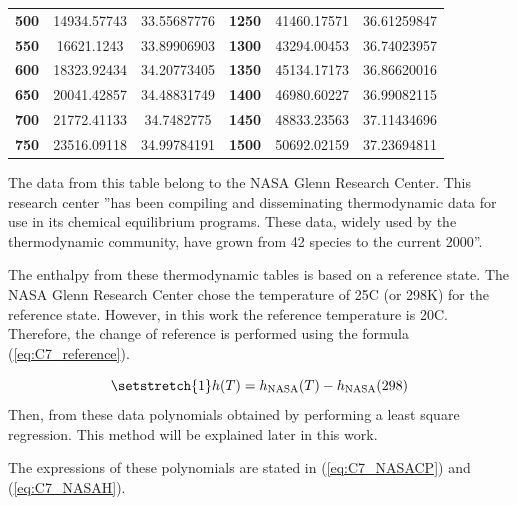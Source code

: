 \begin{longtable}[c]{@{}ccc|ccc@{}}
\textbf{500}                                      & 14934.57743         & 33.55687776            & \textbf{1250}                                   & 41460.17571         & 36.61259847            \\
\textbf{550}                                      & 16621.1243          & 33.89906903            & \textbf{1300}                                   & 43294.00453         & 36.74023957            \\
\textbf{600}                                      & 18323.92434         & 34.20773405            & \textbf{1350}                                   & 45134.17173         & 36.86620016            \\
\textbf{650}                                      & 20041.42857         & 34.48831749            & \textbf{1400}                                   & 46980.60227         & 36.99082115            \\
\textbf{700}                                      & 21772.41133         & 34.7482775             & \textbf{1450}                                   & 48833.23563         & 37.11434696            \\
\textbf{750}                                      & 23516.09118         & 34.99784191            & \textbf{1500}                                   & 50692.02159         & 37.23694811            \\* \bottomrule
\end{longtable}
The data from this table belong to the NASA Glenn Research Center. This research center ''has been compiling and disseminating thermodynamic data for use in its chemical equilibrium programs. These data, widely used by the thermodynamic community, have grown from 42 species to the current 2000''\cite{NASA}. 

The enthalpy from these thermodynamic tables is based on a reference state. The NASA Glenn Research Center chose the temperature of 25\degree C (or 298\degree K) for the reference state. 
However, in this work the reference temperature is 20\degree C. Therefore, the change of reference is performed using the formula (\ref{eq:C7_reference}).

\begin{equation}
\setstretch{1}
h(T) = h_\text{NASA}(T) - h_\text{NASA}(298)\label{eq:C7_reference}
\end{equation}
Then, from these data polynomials obtained by performing a least square regression. This method will be explained later in this work.

The expressions of these polynomials are stated in (\ref{eq:C7_NASACP}) and (\ref{eq:C7_NASAH}).

